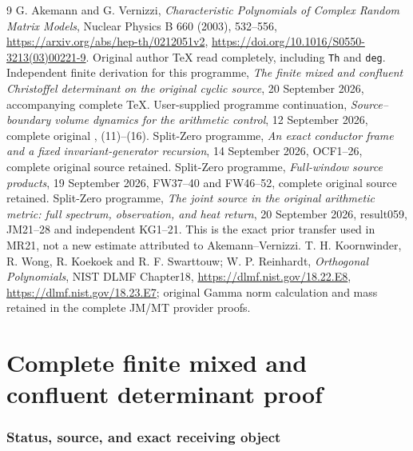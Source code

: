 \documentclass[11pt]{article}
\begin{document}
\begin{thebibliography}{9}
 G. Akemann and G. Vernizzi,
\emph{Characteristic Polynomials of Complex Random Matrix Models},
Nuclear Physics B 660 (2003), 532--556,
\url{https://arxiv.org/abs/hep-th/0212051v2},
\url{https://doi.org/10.1016/S0550-3213(03)00221-9}.
Original author TeX read completely, including \texttt{Th} and \texttt{deg}.
 Independent finite derivation for this programme,
\emph{The finite mixed and confluent Christoffel determinant on the
original cyclic source}, 20 September 2026, accompanying complete TeX.
 User-supplied programme continuation,
\emph{Source--boundary volume dynamics for the arithmetic control},
12 September 2026, complete original , (11)--(16).
 Split-Zero programme,
\emph{An exact conductor frame and a fixed invariant-generator recursion},
14 September 2026, OCF1--26, complete original source retained.
 Split-Zero programme,
\emph{Full-window source products}, 19 September 2026,
FW37--40 and FW46--52, complete original source retained.
 Split-Zero programme,
\emph{The joint source in the original arithmetic metric: full spectrum,
observation, and heat return}, 20 September 2026, result059,
JM21--28 and independent KG1--21. This is the exact prior transfer
used in MR21, not a new estimate attributed to Akemann--Vernizzi.
 T. H. Koornwinder, R. Wong, R. Koekoek and R. F. Swarttouw;
W. P. Reinhardt, \emph{Orthogonal Polynomials}, NIST DLMF Chapter18,
\url{https://dlmf.nist.gov/18.22.E8},
\url{https://dlmf.nist.gov/18.23.E7}; original Gamma norm calculation
and mass retained in the complete JM/MT provider proofs.
\end{thebibliography}

\endgroup

\clearpage\begingroup
\part*{Complete finite mixed and confluent determinant proof}
\newtheorem{mrfinitetheorem}{Theorem}
\newtheorem{mrfinitelemma}[mrfinitetheorem]{Lemma}
\newcommand{\mrfiniteC}{\mathbb C}
\newcommand{\mrfiniteR}{\mathbb R}
\newcommand{\mrfinitePp}{\mathcal P}
\newcommand{\mrfinitedd}{\,d}



\section{Status, source, and exact receiving object}\label{mrfinite:sec:status}
\end{document}
